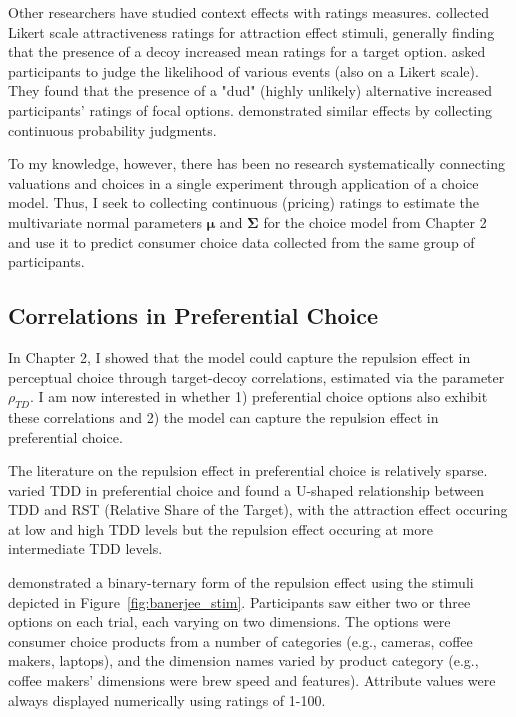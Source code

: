 Other researchers have studied context effects with ratings measures. \textcite{wedellUsingJudgmentsUnderstand} collected Likert scale attractiveness ratings for attraction effect stimuli, generally finding that the presence of a decoy increased mean ratings for a target option. \textcite{windschitl2004dud} asked participants to judge the likelihood of various events (also on a Likert scale). They found that the presence of a "dud" (highly unlikely) alternative increased participants' ratings of focal options. \textcite{caiWhenAlternativeHypotheses2023} demonstrated similar effects by collecting continuous probability judgments.

To my knowledge, however, there has been no research systematically connecting valuations and choices in a single experiment through application of a choice model. Thus, I seek to collecting continuous (pricing) ratings to estimate the multivariate normal parameters $\boldsymbol{\mu}$ and $\boldsymbol{\Sigma}$ for the choice model from Chapter 2 and use it to predict consumer choice data collected from the same group of participants.

\subsection{Correlations in Preferential Choice}
In Chapter 2, I showed that the model could capture the repulsion effect in perceptual choice \parencite{spektorWhenGoodLooks2018b} through target-decoy correlations, estimated via the parameter $\rho_{TD}$. I am now interested in whether 1) preferential choice options also exhibit these correlations and 2) the model can capture the repulsion effect in preferential choice. 

The literature on the repulsion effect in preferential choice is relatively sparse. \textcite{liaoInfluenceDistanceDecoy2021} varied TDD in preferential choice and found a U-shaped relationship between TDD and RST (Relative Share of the Target), with the attraction effect occuring at low and high TDD levels but the repulsion effect occuring at more intermediate TDD levels. 

\textcite{banerjeeFactorsThatPromote2024} demonstrated a binary-ternary form of the repulsion effect using the stimuli depicted in Figure~\ref{fig:banerjee_stim}. Participants saw either two or three options on each trial, each varying on two dimensions. The options were consumer choice products from a number of categories (e.g., cameras, coffee makers, laptops), and the dimension names varied by product category (e.g., coffee makers' dimensions were brew speed and features). Attribute values were always displayed numerically using ratings of 1-100.

